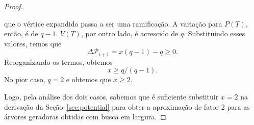 \documentclass[conference]{IEEEtran}
\begin{document}
\begin{proof}
\begin{itemize}
      que o v\'ertice expandido passa a ser uma ramifica\c{c}\~ao. A varia\c{c}\~ao para $P(T)$,
      ent\~ao, \'e de $q - 1$. $V(T)$, por outro lado, \'e acrescido de $q$. Substituindo esses
      valores, temos que
      \begin{equation}
        \Delta \mathcal{P}_{i + 1} = x(q - 1) - q \ge 0.
      \end{equation}
      Reorganizando os termos, obtemos
      \begin{equation} \label{eq:essential}
        x \ge q/(q - 1).
      \end{equation}
      No pior caso, $q = 2$ e obtemos que $x \ge 2$.
  \end{itemize}
  Logo, pela an\'alise dos dois casos, sabemos que \'e suficiente substituir $x = 2$ na
  deriva\c{c}\~ao da Se\c{c}\~ao~\ref{sec:potential} para obter a aproxima\c{c}\~ao de fator 2 para
  as \'arvores geradoras obtidas com busca em largura.
\end{proof}



\end{document}
